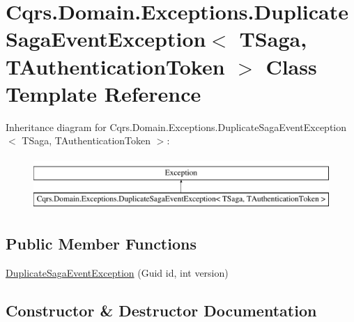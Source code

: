 \hypertarget{classCqrs_1_1Domain_1_1Exceptions_1_1DuplicateSagaEventException}{}\section{Cqrs.\+Domain.\+Exceptions.\+Duplicate\+Saga\+Event\+Exception$<$ T\+Saga, T\+Authentication\+Token $>$ Class Template Reference}
\label{classCqrs_1_1Domain_1_1Exceptions_1_1DuplicateSagaEventException}
Inheritance diagram for Cqrs.\+Domain.\+Exceptions.\+Duplicate\+Saga\+Event\+Exception$<$ T\+Saga, T\+Authentication\+Token $>$\+:\begin{figure}[H]
\begin{center}
\leavevmode
\includegraphics[height=2.000000cm]{classCqrs_1_1Domain_1_1Exceptions_1_1DuplicateSagaEventException}
\end{center}
\end{figure}
\subsection*{Public Member Functions}
\begin{DoxyCompactItemize}
\item 
\hyperlink{classCqrs_1_1Domain_1_1Exceptions_1_1DuplicateSagaEventException_af0a56394404b67c5cb5773d3bd6d1e8e}{Duplicate\+Saga\+Event\+Exception} (Guid id, int version)
\end{DoxyCompactItemize}


\subsection{Constructor \& Destructor Documentation}
\mbox{\label{classCqrs_1_1Domain_1_1Exceptions_1_1DuplicateSagaEventException_af0a56394404b67c5cb5773d3bd6d1e8e}} 
